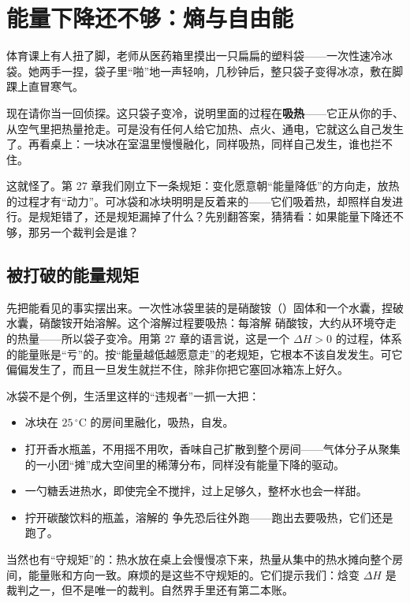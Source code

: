 \chapter{能量下降还不够：熵与自由能}

\begin{kaichang}
体育课上有人扭了脚，老师从医药箱里摸出一只扁扁的塑料袋——一次性速冷冰袋。她两手一捏，袋子里“啪”地一声轻响，几秒钟后，整只袋子变得冰凉，敷在脚踝上直冒寒气。

现在请你当一回侦探。这只袋子变冷，说明里面的过程在\textbf{吸热}——它正从你的手、从空气里把热量抢走。可是没有任何人给它加热、点火、通电，它就这么自己发生了。再看桌上：一块冰在室温里慢慢融化，同样吸热，同样自己发生，谁也拦不住。

这就怪了。第 27 章我们刚立下一条规矩：变化愿意朝“能量降低”的方向走，放热的过程才有“动力”。可冰袋和冰块明明是反着来的——它们吸着热，却照样自发进行。是规矩错了，还是规矩漏掉了什么？先别翻答案，猜猜看：如果能量下降还不够，那另一个裁判会是谁？
\end{kaichang}

\section{被打破的能量规矩}

先把能看见的事实摆出来。一次性冰袋里装的是硝酸铵（）固体和一个水囊，捏破水囊，硝酸铵开始溶解。这个溶解过程要吸热：每溶解  硝酸铵，大约从环境夺走  的热量——所以袋子变冷。用第 27 章的语言说，这是一个 $\Delta H>0$ 的过程，体系的能量账是“亏”的。按“能量越低越愿意走”的老规矩，它根本不该自发发生。可它偏偏发生了，而且一旦发生就拦不住，除非你把它塞回冰箱冻上好久。

冰袋不是个例，生活里这样的“违规者”一抓一大把：

\begin{itemize}[itemsep=2pt]
\item 冰块在 $25\,^{\circ}\mathrm{C}$ 的房间里融化，吸热，自发。
\item 打开香水瓶盖，不用摇不用吹，香味自己扩散到整个房间——气体分子从聚集的一小团“摊”成大空间里的稀薄分布，同样没有能量下降的驱动。
\item 一勺糖丢进热水，即使完全不搅拌，过上足够久，整杯水也会一样甜。
\item 拧开碳酸饮料的瓶盖，溶解的  争先恐后往外跑——跑出去要吸热，它们还是跑了。
\end{itemize}

当然也有“守规矩”的：热水放在桌上会慢慢凉下来，热量从集中的热水摊向整个房间，能量账和方向一致。麻烦的是这些不守规矩的。它们提示我们：焓变 $\Delta H$ 是裁判之一，但不是唯一的裁判。自然界手里还有第二本账。


